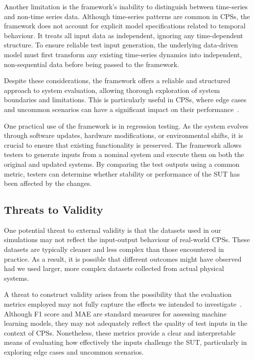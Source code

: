 \documentclass[
]{ceurart}
\theoremstyle{definition}
\begin{document}
Another limitation is the framework’s inability to distinguish between time-series and non-time series data. Although time-series patterns are common in CPSs, the framework does not account for explicit model specifications related to temporal behaviour. It treats all input data as independent, ignoring any time-dependent structure. To ensure reliable test input generation, the underlying data-driven model must first transform any existing time-series dynamics into independent, non-sequential data before being passed to the framework.

Despite these considerations, the framework offers a reliable and structured approach to system evaluation, allowing thorough exploration of system boundaries and limitations. This is particularly useful in CPSs, where edge cases and uncommon scenarios can have a significant impact on their performance~\cite{survey}.

One practical use of the framework is in regression testing. As the system evolves through software updates, hardware modifications, or environmental shifts, it is crucial to ensure that existing functionality is preserved. The framework allows testers to generate inputs from a nominal system and execute them on both the original and updated systems. By comparing the test outputs using a common metric, testers can determine whether stability or performance of the SUT has been affected by the changes.

\subsection{Threats to Validity}

One potential threat to external validity is that the datasets used in our simulations may not reflect the input-output behaviour of real-world CPSs. These datasets are typically cleaner and less complex than those encountered in practice. As a result, it is possible that different outcomes might have observed had we used larger, more complex datasets collected from actual physical systems.

A threat to construct validity arises from the possibility that the evaluation metrics employed may not fully capture the effects we intended to investigate~\cite{durelli}. Although F1 score and MAE are standard measures for assessing machine learning models, they may not adequately reflect the quality of test inputs in the context of CPSs. Nonetheless, these metrics provide a clear and interpretable means of evaluating how effectively the inputs challenge the SUT, particularly in exploring edge cases and uncommon scenarios.
\end{document}
